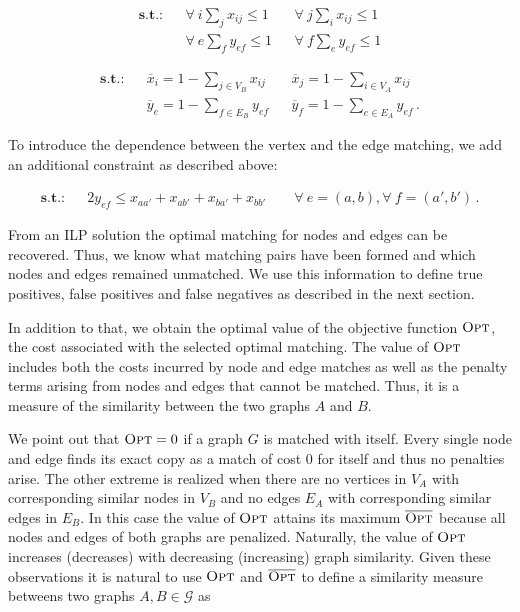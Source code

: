 		\begin{align}
		\textbf{s.t.:} 	& &\forall \ i \sum_{j} x_{ij} \leq 1  &&\forall \ j \sum_{i} x_{ij} \leq 1 \\
						& &\forall \ e \sum_{f} y_{ef} \leq 1  &&\forall \ f \sum_{e} y_{ef} \leq 1				                               
		\end{align}

		\begin{align}
		\textbf{s.t.:} 	& &\overline{x}_{i} =  1 - \sum_{j \in V_B} x_{ij} &&\overline{x}_{j} =  1 - \sum_{i \in V_A} x_{ij} \\          
						& &\overline{y}_{e} =  1 - \sum_{f \in E_B} y_{ef} &&\overline{y}_{f} =  1 - \sum_{e \in E_A} y_{ef} \, .                                        
		\end{align}

		To introduce the dependence between the vertex and the edge matching, we add an additional constraint as described above: 

		\begin{align}
			\textbf{s.t.:} 	& &2y_{ef} \leq x_{aa'} + x_{ab'} + x_{ba'} + x_{bb'}     \quad \quad \forall \ e = (a,b), \forall \ f = (a',b')\,.      
		\end{align}

		From an ILP solution the optimal matching for nodes and edges can be recovered. Thus, we know what matching pairs have been formed and which nodes and edges remained unmatched. We use this information to define true positives, false positives and false negatives as described in the next section. 

		In addition to that, we obtain the optimal value of the objective function $\textsc{Opt}$, \ie the cost associated with the selected optimal matching. The value of $\textsc{Opt}$ includes both the costs incurred by node and edge matches as well as the penalty terms arising from nodes and edges that cannot be matched. Thus, it is a measure of the similarity between the two graphs $A$ and $B$.

		We point out that $\textsc{Opt} = 0$ if a graph $G$ is matched with itself. Every single node and edge finds its exact copy as a match of cost $0$ for itself and thus no penalties arise. The other extreme is realized when there are no vertices in $V_A$ with corresponding similar nodes in $V_B$ and no edges $E_A$ with corresponding similar edges in $E_B$. In this case the value of $\textsc{Opt}$ attains its maximum $\overline{\textsc{Opt}}$ because all nodes and edges of both graphs are penalized. Naturally, the value of $\textsc{Opt}$ increases (decreases) with decreasing (increasing) graph similarity. Given these observations it is natural to use $\textsc{Opt}$ and $\overline{\textsc{Opt}}$ to define a similarity measure betweens two graphs $A, B \in \mathcal{G}$ as

